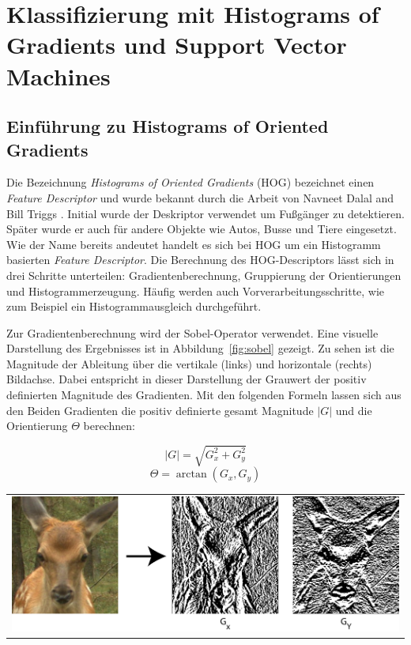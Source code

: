 \newpage
\section{Klassifizierung mit Histograms of Gradients und Support Vector Machines} \label{sec:HOG}


\subsection{Einführung zu Histograms of Oriented Gradients} \label{ssec:intro_HOG}

Die Bezeichnung \textit{Histograms of Oriented Gradients} (HOG) bezeichnet einen \textit{Feature Descriptor} und wurde bekannt durch die Arbeit von Navneet Dalal and Bill Triggs \cite{dalal05}. Initial wurde der Deskriptor verwendet um Fußgänger zu detektieren. Später wurde er auch für andere Objekte wie Autos, Busse und Tiere eingesetzt. Wie der Name bereits andeutet handelt es sich bei HOG um ein Histogramm basierten \textit{Feature Descriptor}. Die Berechnung des HOG-Descriptors lässt sich in drei Schritte unterteilen: Gradientenberechnung, Gruppierung der Orientierungen und Histogrammerzeugung. Häufig werden  auch Vorverarbeitungsschritte, wie zum Beispiel ein Histogrammausgleich durchgeführt.

Zur Gradientenberechnung wird der Sobel-Operator verwendet. Eine visuelle Darstellung des Ergebnisses ist in Abbildung~\ref{fig:sobel} gezeigt. Zu sehen ist die Magnitude der Ableitung über die vertikale (links) und horizontale (rechts) Bildachse. Dabei entspricht in dieser Darstellung der Grauwert der positiv definierten Magnitude des Gradienten. Mit den folgenden Formeln lassen sich aus den Beiden Gradienten die positiv definierte gesamt Magnitude $|G|$ und die Orientierung $\Theta$ berechnen:  

\begin{equation}
|G| = \sqrt{G_x^2 + G_y^2}
\end{equation}
\begin{equation}
\Theta = \arctan({G_x, G_y})
\end{equation}

\begin{center}
\begin{tabular}{c}
\includegraphics[trim={0 0cm 0cm 0cm},clip=true,width=13cm]{img/sobel.png}
\end{tabular}
\label{fig:sobel}
\end{center}

